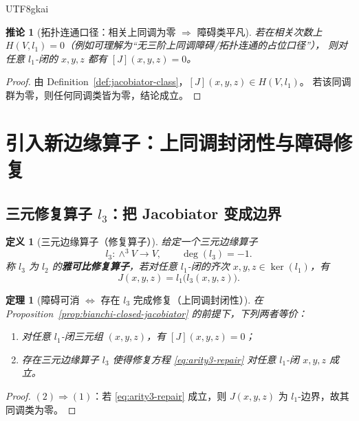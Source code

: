 \documentclass[12pt]{article}
\newtheorem{definition}{定义}[section]
\newtheorem{theorem}{定理}[section]
\newtheorem{corollary}{推论}[section]
\begin{document}
\begin{CJK*}{UTF8}{gkai}
\begin{corollary}[拓扑连通口径：相关上同调为零 $\Rightarrow$ 障碍类平凡]
\label{cor:connectedness-kills-obstruction}
若在相关次数上 $H(V,l_1)=0$（例如可理解为“无三阶上同调障碍/拓扑连通的占位口径”），
则对任意 $l_1$-闭的 $x,y,z$ 都有 $[J](x,y,z)=0$。
\end{corollary}

\begin{proof}
由 Definition~\ref{def:jacobiator-class}，$[J](x,y,z)\in H(V,l_1)$。
若该同调群为零，则任何同调类皆为零，结论成立。
\end{proof}

\section{引入新边缘算子：上同调封闭性与障碍修复}

\subsection{三元修复算子 $l_3$：把 Jacobiator 变成边界}

\begin{definition}[三元边缘算子（修复算子）]
给定一个三元边缘算子
\[
  l_3:\wedge^3V\to V,
  \qquad
  \deg(l_3)=-1.
\]
称 $l_3$ 为 $l_2$ 的\textbf{雅可比修复算子}，若对任意 $l_1$-闭的齐次 $x,y,z\in\ker(l_1)$，有
\begin{equation}
\label{eq:arity3-repair}
  J(x,y,z)=l_1\bigl(l_3(x,y,z)\bigr).
\end{equation}
\end{definition}

\begin{theorem}[障碍可消 $\Longleftrightarrow$ 存在 $l_3$ 完成修复（上同调封闭性）]
\label{thm:obstruction-vanish-iff-l3}
在 Proposition~\ref{prop:bianchi-closed-jacobiator} 的前提下，下列两者等价：
\begin{enumerate}
  \item 对任意 $l_1$-闭三元组 $(x,y,z)$，有 $[J](x,y,z)=0$；
  \item 存在三元边缘算子 $l_3$ 使得修复方程 \eqref{eq:arity3-repair} 对任意 $l_1$-闭 $x,y,z$ 成立。
\end{enumerate}
\end{theorem}

\begin{proof}
$(2)\Rightarrow(1)$：若 \eqref{eq:arity3-repair} 成立，则 $J(x,y,z)$ 为 $l_1$-边界，故其同调类为零。


\end{proof}
\end{CJK*}
\end{document}

